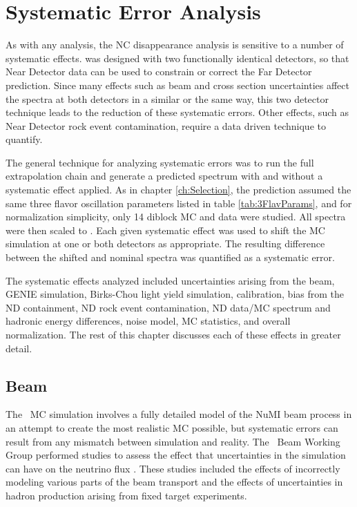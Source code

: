 \chapter{Systematic Error Analysis}
\label{ch:Systs}

As with any analysis, the NC disappearance analysis is sensitive to a number of systematic effects. \nova\newline\n was designed with two functionally identical detectors, so that Near Detector data can be used to constrain or correct the Far Detector prediction. Since many effects such as beam and cross section uncertainties affect the spectra at both detectors in a similar or the same way, this two detector technique leads to the reduction of these systematic errors. Other effects, such as Near Detector rock event contamination, require a data driven technique to quantify.

The general technique for analyzing systematic errors was to run the full extrapolation chain and generate a predicted spectrum with and without a systematic effect applied. As in chapter \ref{ch:Selection}, the prediction assumed the same three flavor oscillation parameters listed in table \ref{tab:3FlavParams}, and for normalization simplicity, only 14 diblock MC and data were studied. All spectra were then scaled to . Each given systematic effect was used to shift the MC simulation at one or both detectors as appropriate. The resulting difference between the shifted and nominal spectra was quantified as a systematic error.

The systematic effects analyzed included uncertainties arising from the beam, GENIE simulation, Birks-Chou light yield simulation, calibration, bias from the ND containment, ND rock event contamination, ND data/MC spectrum and hadronic energy differences, noise model, MC statistics, and overall normalization. The rest of this chapter discusses each of these effects in greater detail.

\section{Beam}
\label{sec:SystBeam}

The \nova~MC simulation involves a fully detailed model of the NuMI beam process in an attempt to create the most realistic MC possible, but systematic errors can result from any mismatch between simulation and reality. The \nova~Beam Working Group performed studies to assess the effect that uncertainties in the simulation can have on the neutrino flux \cite{ref:TNBeam}. These studies included the effects of incorrectly modeling various parts of the beam transport and the effects of uncertainties in hadron production arising from fixed target experiments.

